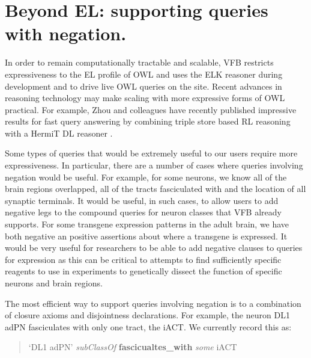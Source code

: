 \documentclass[runningheads,a4paper]{llncs}
\begin{document}

%


\section{Beyond EL: supporting queries with negation.}

In order to remain computationally tractable and scalable, VFB
restricts expressiveness to the EL profile of OWL and uses the ELK
reasoner \cite{kazakov2012elk} during development and to drive live
OWL queries on the site. Recent advances in reasoning
technology may make scaling with more expressive forms of OWL
practical. For example, Zhou and colleagues have recently published
impressive results for fast query answering by combining triple store
based RL reasoning with a HermiT DL reasoner \cite{ZNCH14a}.

Some types of queries that would be extremely useful to our users
require more expressiveness.  In particular, there are a number of
cases where queries involving negation would be useful.  For example,
for some neurons, we know all of the brain regions overlapped, all of
the tracts fasciculated with and the location of all synaptic
terminals.  It would be useful, in such cases, to allow users to add
negative legs to the compound queries for neuron classes that VFB
already supports.  For some transgene expression
patterns in the adult brain, we have both negative an positive
assertions about where a transgene is expressed.  It would be very
useful for researchers to be able to add negative clauses to queries for
expression as this can be critical to attempts to find sufficiently
specific reagents to use in experiments to genetically dissect the
function of specific neurons and brain regions.

The most efficient way to support queries involving negation is to a
combination of closure axioms and disjointness declarations.  For
example, the neuron DL1 adPN fasciculates with only one tract, the
iACT.  We currently record this as:


\begin{quote}
`DL1 adPN' \textit{subClassOf} \textbf{fascicualtes\_with} \textit{some} iACT
\end{quote}
\end{document}
